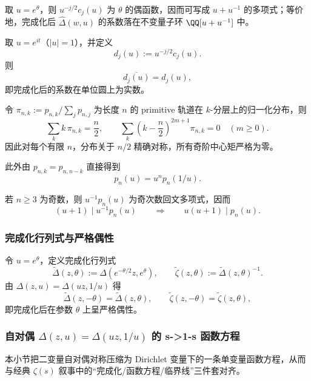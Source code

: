 \begin{remark}
取 $u=e^\theta$，则 $u^{-j/2}c_j(u)$ 为 $\theta$ 的偶函数，因而可写成 $u+u^{-1}$ 的多项式；等价地，完成化后 $\widehat{\Delta}(w,u)$ 的系数落在不变量子环 $\QQ[u+u^{-1}]$ 中。
\end{remark}

\begin{corollary}\label{cor:completion-real-line}
取 $u=e^{it}$（$|u|=1$），并定义
\[
d_j(u):=u^{-j/2}c_j(u).
\]
则
\[
\overline{d_j(u)}=d_j(u),
\]
即完成化后的系数在单位圆上为实数。
\end{corollary}

\begin{corollary}[有限长度的精确镜像对称]\label{cor:primitive-finite-sym}
令 $\pi_{n,k}:=p_{n,k}/\sum_j p_{n,j}$ 为长度 $n$ 的 primitive 轨道在 $k$-分层上的归一化分布，则
\[
\sum_k k\,\pi_{n,k}=\frac{n}{2},\qquad
\sum_k\left(k-\frac{n}{2}\right)^{2m+1}\pi_{n,k}=0\quad(m\ge 0).
\]
因此对每个有限 $n$，分布关于 $n/2$ 精确对称，所有奇阶中心矩严格为零。
\end{corollary}

此外由 $p_{n,k}=p_{n,n-k}$ 直接得到
\[
p_n(u)=u^n p_n(1/u).
\]

\begin{corollary}\label{cor:primitive-odd-div}
若 $n\ge 3$ 为奇数，则 $u^{-1}p_n(u)$ 为奇次数回文多项式，因而
\[
(u+1)\mid u^{-1}p_n(u)\qquad\Longrightarrow\qquad u(u+1)\mid p_n(u).
\]
\end{corollary}

\subsubsection{完成化行列式与严格偶性}\label{app:kernel-completion}
令 $u=e^\theta$，定义完成化行列式
\[
\widetilde{\Delta}(z,\theta):=\Delta(e^{-\theta/2}z,e^\theta),
\qquad
\widetilde{\zeta}(z,\theta):=\widetilde{\Delta}(z,\theta)^{-1}.
\]
由 $\Delta(z,u)=\Delta(uz,1/u)$ 得
\[
\widetilde{\Delta}(z,-\theta)=\widetilde{\Delta}(z,\theta),
\qquad
\widetilde{\zeta}(z,-\theta)=\widetilde{\zeta}(z,\theta),
\]
即完成化后在参数 $\theta$ 上呈严格偶性。

\subsubsection{自对偶 \texorpdfstring{$\Delta(z,u)=\Delta(uz,1/u)$}{Delta(z,u)=Delta(uz,1/u)} 的 s->1-s 函数方程}\label{app:kernel-functional-equation}
本小节把二变量自对偶对称压缩为 Dirichlet 变量下的一条单变量函数方程，从而与经典 $\zeta(s)$ 叙事中的“完成化/函数方程/临界线”三件套对齐。

